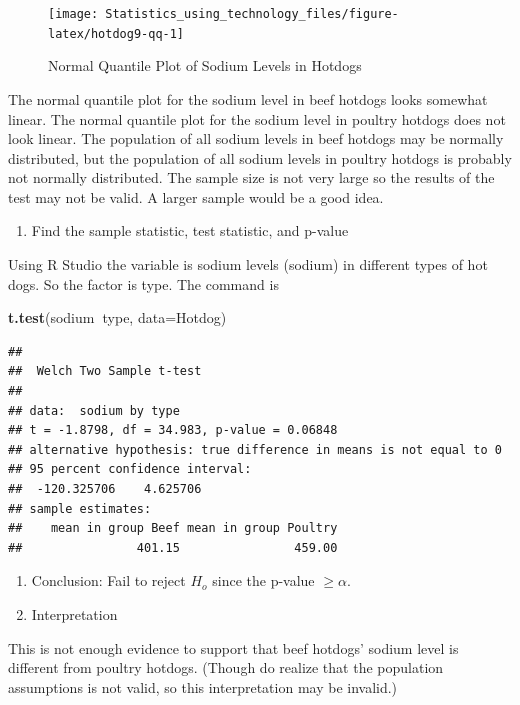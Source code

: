 \documentclass[
]{book}
\newenvironment{Shaded}{\begin{snugshade}}{\end{snugshade}}
\newcommand{\DataTypeTok}[1]{\textcolor[rgb]{0.13,0.29,0.53}{#1}}
\newcommand{\KeywordTok}[1]{\textcolor[rgb]{0.13,0.29,0.53}{\textbf{#1}}}
\newcommand{\NormalTok}[1]{#1}
\newcommand{\OperatorTok}[1]{\textcolor[rgb]{0.81,0.36,0.00}{\textbf{#1}}}
\providecommand{\tightlist}{%
  \setlength{\itemsep}{0pt}\setlength{\parskip}{0pt}}
\begin{document}
\begin{figure}
\texttt{[image: Statistics\_using\_technology\_files/figure-latex/hotdog9-qq-1]} \caption{Normal Quantile Plot of Sodium Levels in Hotdogs}\label{fig:hotdog9-qq}
\end{figure}

The normal quantile plot for the sodium level in beef hotdogs looks somewhat linear. The normal quantile plot for the sodium level in poultry hotdogs does not look linear. The population of all sodium levels in beef hotdogs may be normally distributed, but the population of all sodium levels in poultry hotdogs is probably not normally distributed. The sample size is not very large so the results of the test may not be valid. A larger sample would be a good idea.

\begin{enumerate}
\def\labelenumi{\arabic{enumi}.}
\setcounter{enumi}{3}
\tightlist
\item
  Find the sample statistic, test statistic, and p-value
\end{enumerate}

Using R Studio the variable is sodium levels (sodium) in different types of hot dogs. So the factor is type. The command is

\begin{Shaded}
\begin{Highlighting}[]
\KeywordTok{t.test}\NormalTok{(sodium}\OperatorTok{~}\NormalTok{type, }\DataTypeTok{data=}\NormalTok{Hotdog)}
\end{Highlighting}
\end{Shaded}

\begin{verbatim}
## 
##  Welch Two Sample t-test
## 
## data:  sodium by type
## t = -1.8798, df = 34.983, p-value = 0.06848
## alternative hypothesis: true difference in means is not equal to 0
## 95 percent confidence interval:
##  -120.325706    4.625706
## sample estimates:
##    mean in group Beef mean in group Poultry 
##                401.15                459.00
\end{verbatim}

\begin{enumerate}
\def\labelenumi{\arabic{enumi}.}
\setcounter{enumi}{4}
\item
  Conclusion: Fail to reject \(H_o\) since the p-value \(\ge \alpha\).
\item
  Interpretation
\end{enumerate}

This is not enough evidence to support that beef hotdogs' sodium level is different from poultry hotdogs. (Though do realize that the population assumptions is not valid, so this interpretation may be invalid.)
\end{document}
